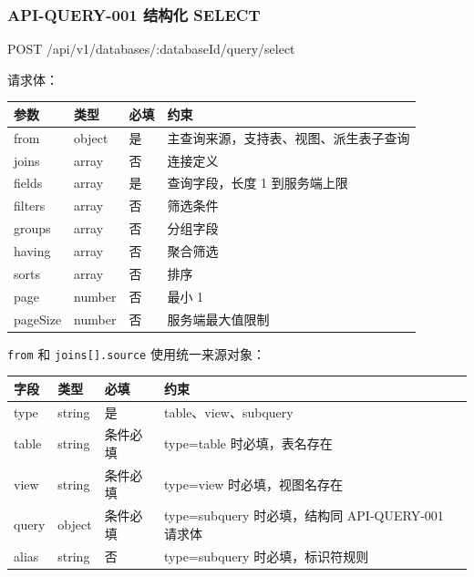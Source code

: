 \documentclass[
  a4paper,
  UTF8]{ctexart}
\newenvironment{Shaded}{}{}
\newcommand{\NormalTok}[1]{#1}
\begin{document}
\hypertarget{api-query-001-ux7ed3ux6784ux5316-select}{%
\subsubsection{API-QUERY-001 结构化
SELECT}\label{api-query-001-ux7ed3ux6784ux5316-select}}

\begin{Shaded}
\begin{Highlighting}[]
\NormalTok{POST /api/v1/databases/:databaseId/query/select}
\end{Highlighting}
\end{Shaded}

请求体：

\begin{longtable}[]{@{}llll@{}}
\toprule
参数 & 类型 & 必填 & 约束 \\
\midrule
\endhead
from & object & 是 & 主查询来源，支持表、视图、派生表子查询 \\
joins & array & 否 & 连接定义 \\
fields & array & 是 & 查询字段，长度 1 到服务端上限 \\
filters & array & 否 & 筛选条件 \\
groups & array & 否 & 分组字段 \\
having & array & 否 & 聚合筛选 \\
sorts & array & 否 & 排序 \\
page & number & 否 & 最小 1 \\
pageSize & number & 否 & 服务端最大值限制 \\
\bottomrule
\end{longtable}

\texttt{from} 和 \texttt{joins{[}{]}.source} 使用统一来源对象：

\begin{longtable}[]{@{}llll@{}}
\toprule
字段 & 类型 & 必填 & 约束 \\
\midrule
\endhead
type & string & 是 & table、view、subquery \\
table & string & 条件必填 & type=table 时必填，表名存在 \\
view & string & 条件必填 & type=view 时必填，视图名存在 \\
query & object & 条件必填 & type=subquery 时必填，结构同 API-QUERY-001
请求体 \\
alias & string & 否 & type=subquery 时必填，标识符规则 \\
\bottomrule
\end{longtable}
\end{document}
